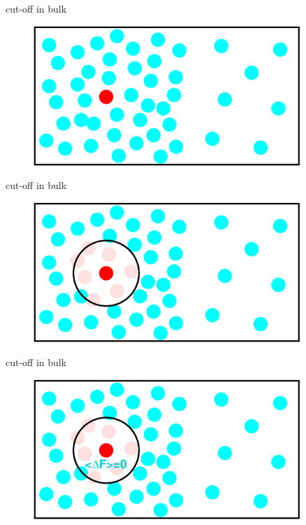 \documentclass{beamer}
\begin{document}
\begin{frame}{cut-off in bulk}
  \begin{figure}
    \centering
    \includegraphics[width=0.9\textwidth]{figs/t0.85-n16000-rc07.5uni/cut-bulk-step01.eps}
  \end{figure}  
\end{frame}

\begin{frame}{cut-off in bulk}
  \begin{figure}
    \centering
    \includegraphics[width=0.9\textwidth]{figs/t0.85-n16000-rc07.5uni/cut-bulk-step02.eps}
  \end{figure}  
\end{frame}

\begin{frame}{cut-off in bulk}
  \begin{figure}
    \centering
    \includegraphics[width=0.9\textwidth]{figs/t0.85-n16000-rc07.5uni/cut-bulk-step03.eps}
  \end{figure}  
\end{frame}
\end{document}
